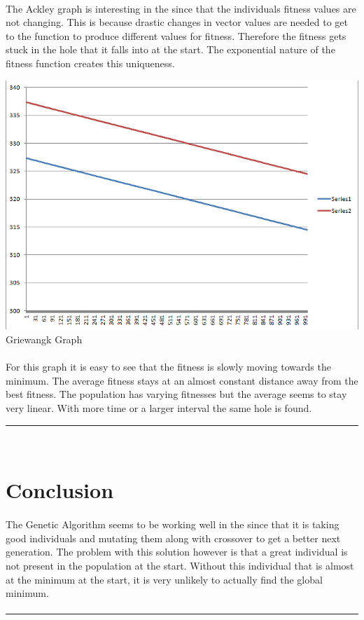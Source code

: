\documentclass[paper=a4, fontsize=11pt]{scrartcl} %
\numberwithin{equation}{section} %
\numberwithin{figure}{section} %
\numberwithin{table}{section} %
\newcommand{\horrule}[1]{\rule{\linewidth}{#1}} %
\begin{document}
\paragraph{} The Ackley graph is interesting in the since that the individuals fitness values are not changing. This is because drastic changes in vector values are needed to get to the function to produce different values for fitness. Therefore the fitness gets stuck in the hole that it falls into at the start. The exponential nature of the fitness function creates this uniqueness.

\includegraphics{Griewangk}
Griewangk Graph

\paragraph{} For this graph it is easy to see that the fitness is slowly moving towards the minimum. The average fitness stays at an almost constant distance away from the best fitness. The population has varying fitnesses but the average seems to stay very linear. With more time or a larger interval the same hole is found.


\horrule{0.5pt} \\[0.4cm] %
\section{Conclusion}

\paragraph{} The Genetic Algorithm seems to be working well in the since that it is taking good individuals and mutating them along with crossover to get a better next generation. The problem with this solution however is that a great individual is not present in the population at the start. Without this individual that is almost at the minimum at the start, it is very unlikely to actually find the global minimum.

\paragraph{} 

\horrule{0.5pt} \\[0.4cm] %
\end{document}
